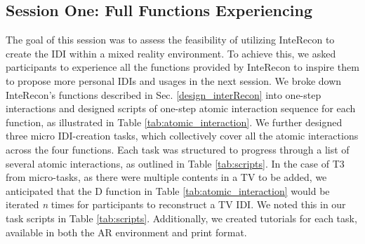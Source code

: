 \subsection{Session One: Full Functions Experiencing}
\label{session-one}
The goal of this session was to assess the feasibility of utilizing InteRecon to create the IDI within a mixed reality environment. 
To achieve this, we asked participants to experience all the functions provided by InteRecon to inspire them to propose more personal IDIs and usages in the next session.
We broke down InteRecon's functions described in Sec. \ref{design_interRecon} into one-step interactions and designed scripts of one-step atomic interaction sequence for each function, as illustrated in Table \ref{tab:atomic_interaction}. 
We further designed three micro IDI-creation tasks, which collectively cover all the atomic interactions across the four functions.
Each task was structured to progress through a list of several atomic interactions, as outlined in Table \ref{tab:scripts}. 
In the case of T3 from micro-tasks, as there were multiple contents in a TV to be added, we anticipated that the D function in Table \ref{tab:atomic_interaction} would be iterated \textit{n} times for participants to reconstruct a TV IDI.
We noted this in our task scripts in Table \ref{tab:scripts}. 
Additionally, we created tutorials for each task, available in both the AR environment and print format. 


